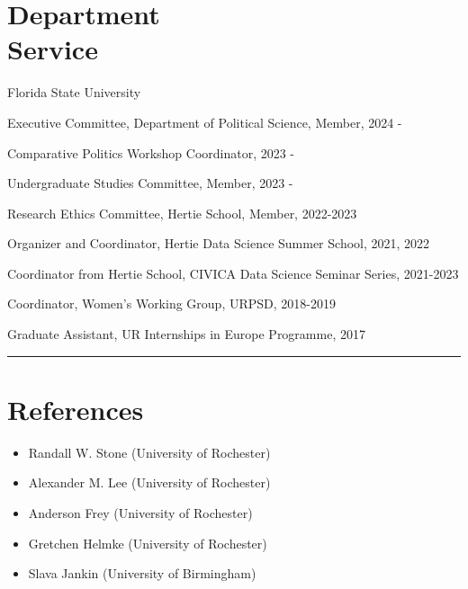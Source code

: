 \documentclass[margin,line,10.95pt]{res}
\newenvironment{list1}{
  \begin{list}{\ding{113}}{%
      \setlength{\itemsep}{0in}
      \setlength{\parsep}{0in} \setlength{\parskip}{0in}
      \setlength{\topsep}{0in} \setlength{\partopsep}{0in}
      \setlength{\leftmargin}{0.17in}}}{\end{list}}
\begin{document}
\begin{resume}
\section{\sc Department \\ Service}

{Florida State University}\\
\vspace*{-.1in}
\begin{list1}
\item[] Executive Committee, Department of Political Science, Member, 2024 - 
\item[] Comparative Politics Workshop Coordinator, 2023 -
\item[] Undergraduate Studies Committee, Member, 2023 -
\end{list1}

Research Ethics Committee, Hertie School, Member, 2022-2023
\vspace*{-4.5mm}

Organizer and Coordinator, Hertie Data Science Summer School, 2021, 2022
\vspace*{-4.5mm}

Coordinator from Hertie School, CIVICA Data Science Seminar Series, 2021-2023
\vspace*{-3.5mm}

Coordinator, Women's Working Group,  URPSD,  2018-2019
\vspace*{-4.5mm}

Graduate Assistant, UR Internships in Europe Programme,  2017

\begin{center}
	\noindent\rule{8cm}{0.4pt}
\end{center}
\vspace{0.5em}

\section{\sc References}
\begin{itemize}
	\item Randall W. Stone (University of Rochester)
	\item Alexander M. Lee (University of Rochester)
	\item Anderson Frey (University of Rochester)
	\item Gretchen Helmke (University of Rochester) 
	\item Slava Jankin (University of Birmingham)




\end{itemize}
\end{resume}
\end{document}
